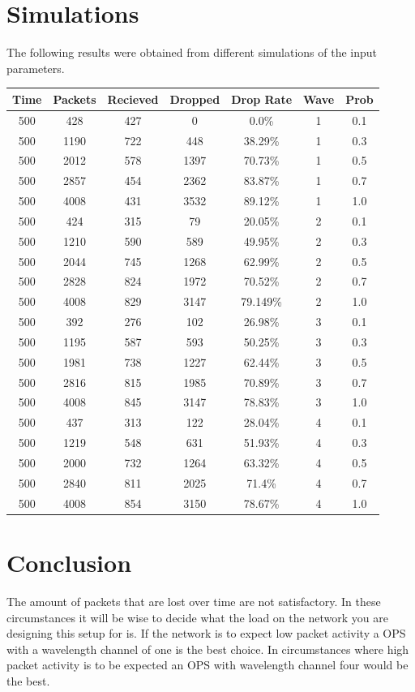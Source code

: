 \documentclass[a4paper,11pt,titlepage]{article}
\begin{document}
\section{Simulations}
The following results were obtained from different simulations of the input parameters.\\
\begin{tabular}{|c|c|c|c|c|c|c|}
\hline
	Time & Packets & Recieved & Dropped & Drop Rate & Wave & Prob\\
\hline
	500 & 	428		&		427			&	0				&	0.0\%			&	1		&		0.1\\
	500 & 	1190	&		722			&	448			&	38.29\%		&	1		&		0.3\\
	500 & 	2012	&		578			&	1397		&	70.73\%		&	1		&		0.5\\
	500 & 	2857 	&		454			&	2362		&	83.87\%		&	1		&		0.7\\
	500 & 	4008	&		431			&	3532		&	89.12\%		&	1		&		1.0\\
\hline
	500 & 	424		&		315			&	79			&	20.05\%		&	2		&		0.1\\
	500 & 	1210 	&		590			&	589			&	49.95\%		&	2		&		0.3\\
	500 & 	2044	&		745			&	1268		&	62.99\%		&	2		&		0.5\\
	500 & 	2828	&		824			&	1972		&	70.52\%		&	2		&		0.7\\
	500 & 	4008	&		829			&	3147		&	79.149\%	&	2		&		1.0\\
\hline 
	500 & 	392		&		276			&	102			&	26.98\%		&	3		&		0.1\\
	500 & 	1195	&		587			&	593			&	50.25\%		&	3		&		0.3\\
	500 & 	1981	&		738			&	1227		&	62.44\%		&	3		&		0.5\\
	500 & 	2816	&		815 		&	1985		&	70.89\%		&	3		&		0.7\\
	500 & 	4008  &		845 		&	3147		&	78.83\%		&	3		&		1.0\\
\hline 
	500 & 	437 	&		313			&	122			&	28.04\%		&	4		&		0.1\\
	500 & 	1219	&		548			&	631			&	51.93\%		&	4		&		0.3\\
	500 & 	2000  &		732 		&	1264		&	63.32\%		&	4		&		0.5\\
	500 & 	2840	&		811 		&	2025		&	71.4\%		&	4		&		0.7\\
	500 & 	4008 	&		854 		&	3150		&	78.67\%		&	4		&		1.0\\
\hline  
\end{tabular}
\section{Conclusion}
The amount of packets that are lost over time are not satisfactory. In these circumstances it will be wise to decide what the load on the network you are designing this setup for is. If the network is to expect low packet activity a OPS with a wavelength channel of one is the best choice. In circumstances where high packet activity is to be expected an OPS with wavelength channel four would be the best.
\end{document}
